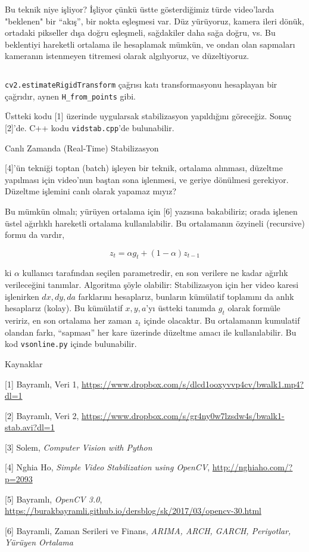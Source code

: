 \documentclass[12pt,fleqn]{article}\usepackage{../../common}
\begin{document}
Bu teknik niye işliyor? İşliyor çünkü üstte gösterdiğimiz türde video'larda
"beklenen" bir ``akış'', bir nokta eşleşmesi var. Düz yürüyoruz, kamera
ileri dönük, ortadaki pikseller dışa doğru eşleşmeli, sağdakiler daha sağa
doğru, vs.  Bu beklentiyi hareketli ortalama ile hesaplamak mümkün, ve
ondan olan sapmaları kameranın istenmeyen titremesi olarak algılıyoruz, ve
düzeltiyoruz.

\inputminted[fontsize=\footnotesize]{python}{vidstab.py}

\verb!cv2.estimateRigidTransform! çağrısı katı transformasyonu hesaplayan
bir çağrıdır, aynen \verb!H_from_points! gibi. 

Üstteki kodu [1] üzerinde uygularsak stabilizasyon yapıldığını
göreceğiz. Sonuç [2]'de. C++ kodu \verb!vidstab.cpp!'de bulunabilir.

Canlı Zamanda (Real-Time) Stabilizasyon

[4]'ün tekniği toptan (batch) işleyen bir teknik, ortalama alınması,
düzeltme yapılması için video'nun baştan sona işlenmesi, ve geriye
dönülmesi gerekiyor. Düzeltme işlemini canlı olarak yapamaz mıyız?

Bu mümkün olmalı; yürüyen ortalama için [6] yazısına bakabiliriz;
orada işlenen üstel ağırlıklı hareketli ortalama kullanılabilir. Bu
ortalamanın özyineli (recursive) formu da vardır,

$$ z_t = \alpha g_t + (1-\alpha) z_{t-1}$$

ki $\alpha$ kullanıcı tarafından seçilen parametredir, en son verilere ne
kadar ağırlık verileceğini tanımlar. Algoritma şöyle olabilir:
Stabilizasyon için her video karesi işlenirken $dx,dy,da$ farklarını
hesaplarız, bunların kümülatif toplamını da anlık hesaplarız (kolay). Bu
kümülatif $x,y,a$'yı üstteki tanımda $g_t$ olarak formüle veririz, en son
ortalama her zaman $z_t$ içinde olacaktır. Bu ortalamanın kumulatif olandan
farkı, ``sapması'' her kare üzerinde düzeltme amacı ile kullanılabilir. Bu
kod \verb!vsonline.py! içinde bulunabilir.

Kaynaklar

[1] Bayramlı, Veri 1, \url{https://www.dropbox.com/s/dlcd1ooxyvvp4cv/bwalk1.mp4?dl=1}

[2] Bayramlı, Veri 2, \url{https://www.dropbox.com/s/gr4ny0w7lzsdw4s/bwalk1-stab.avi?dl=1}

[3] Solem, {\em Computer Vision with Python}

[4] Nghia Ho, {\em Simple Video Stabilization using OpenCV},
    \url{http://nghiaho.com/?p=2093}

[5] Bayramlı, {\em OpenCV 3.0}, 
    \url{https://burakbayramli.github.io/dersblog/sk/2017/03/opencv-30.html}

[6] Bayramli, Zaman Serileri ve Finans, {\em ARIMA, ARCH, GARCH, Periyotlar, Yürüyen Ortalama}
\end{document}
